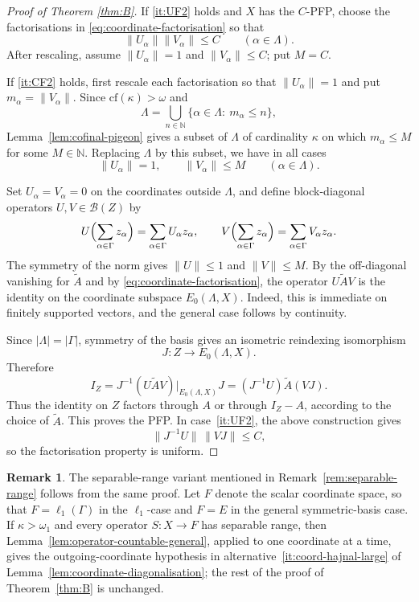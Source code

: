 \documentclass[11pt]{amsart}
\theoremstyle{plain}
\theoremstyle{definition}
\newtheorem{remark}[theorem]{Remark}
\numberwithin{equation}{section}
\newcommand{\norm}[1]{\lVert #1 \rVert}
\newcommand{\abs}[1]{\left|#1\right|}
\newcommand{\Bop}{\mathcal{B}}
\newcommand{\N}{\mathbb{N}}
\newcommand{\cf}{\mathrm{cf}}
\renewcommand{\le}{\leqslant}
\begin{document}
\begin{proof}[Proof of Theorem \ref{thm:B}]
If \ref{it:UF2} holds and $X$ has the $C$-PFP, choose the factorisations in \eqref{eq:coordinate-factorisation} so that
\[
    \norm{U_\alpha}\norm{V_\alpha}\le C
    \qquad(\alpha\in\Lambda).
\]
After rescaling, assume $\norm{U_\alpha}=1$ and $\norm{V_\alpha}\le C$; put $M=C$.

If \ref{it:CF2} holds, first rescale each factorisation so that $\norm{U_\alpha}=1$ and put $m_\alpha=\norm{V_\alpha}$.  Since $\cf(\kappa)>\omega$ and
\[
    \Lambda=\bigcup_{n\in\N}\{\alpha\in\Lambda:\ m_\alpha\le n\},
\]
Lemma~\ref{lem:cofinal-pigeon} gives a subset of $\Lambda$ of cardinality $\kappa$ on which $m_\alpha\le M$ for some $M\in\N$.  Replacing $\Lambda$ by this subset, we have in all cases
\begin{equation}\label{eq:coordinate-uniform-bound}
    \norm{U_\alpha}=1,
    \qquad
    \norm{V_\alpha}\le M
    \qquad(\alpha\in\Lambda).
\end{equation}

Set $U_\alpha=V_\alpha=0$ on the coordinates outside $\Lambda$, and define block-diagonal operators $U,V\in\Bop(Z)$ by
\[
    U\Bigl(\sum_{\alpha\in\Gamma}z_\alpha\Bigr)=\sum_{\alpha\in\Gamma}U_\alpha z_\alpha,
    \qquad
    V\Bigl(\sum_{\alpha\in\Gamma}z_\alpha\Bigr)=\sum_{\alpha\in\Gamma}V_\alpha z_\alpha.
\]
The symmetry of the norm gives $\norm U\le1$ and $\norm V\le M$.  By the off-diagonal vanishing for $\widetilde A$ and by \eqref{eq:coordinate-factorisation}, the operator $U\widetilde A V$ is the identity on the coordinate subspace $E_0(\Lambda,X)$.  Indeed, this is immediate on finitely supported vectors, and the general case follows by continuity.

Since $\abs{\Lambda}=\abs{\Gamma}$, symmetry of the basis gives an isometric reindexing isomorphism
\[
    J\colon Z\to E_0(\Lambda,X).
\]
Therefore
\[
    I_Z=J^{-1}(U\widetilde A V)|_{E_0(\Lambda,X)}J=(J^{-1}U)\widetilde A(VJ).
\]
Thus the identity on $Z$ factors through $A$ or through $I_Z-A$, according to the choice of $\widetilde A$.  This proves the PFP.  In case~\ref{it:UF2}, the above construction gives
\[
    \norm{J^{-1}U}\,\norm{VJ}\le C,
\]
so the factorisation property is uniform.
\end{proof}

\begin{remark}
The separable-range variant mentioned in Remark~\ref{rem:separable-range} follows from the same proof.  Let $F$ denote the scalar coordinate space, so that $F=\ell_1(\Gamma)$ in the $\ell_1$-case and $F=E$ in the general symmetric-basis case.  If $\kappa>\omega_1$ and every operator $S\colon X\to F$ has separable range, then Lemma~\ref{lem:operator-countable-general}, applied to one coordinate at a time, gives the outgoing-coordinate hypothesis in alternative~\ref{it:coord-hajnal-large} of Lemma~\ref{lem:coordinate-diagonalisation}; the rest of the proof of Theorem~\ref{thm:B} is unchanged.
\end{remark}
\end{document}
